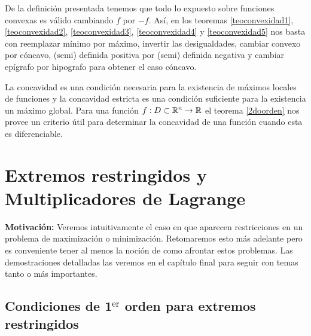 De la definici\'on presentada tenemos que todo lo expuesto sobre funciones convexas es v\'alido cambiando $f$ por $-f$. As\'i, en los teoremas \ref{teoconvexidad1}, \ref{teoconvexidad2}, \ref{teoconvexidad3}, \ref{teoconvexidad4} y \ref{teoconvexidad5} nos basta con reemplazar m\'inimo por m\'aximo, invertir las desigualdades, cambiar convexo por c\'oncavo, (semi) definida positiva por (semi) definida negativa y cambiar ep\'igrafo por hipografo para obtener el caso c\'oncavo.

La concavidad es una condici\'on necesaria para la existencia de m\'aximos locales de funciones y la concavidad estricta es una condici\'on suficiente para la existencia un m\'aximo global. Para una funci\'on $f: D\subset \mathbb{R}^n \to \mathbb{R}$ el teorema \ref{2doorden} nos provee un criterio \'util para determinar la concavidad de una funci\'on cuando esta es diferenciable.

\section{Extremos restringidos y Multiplicadores de Lagrange}

\textbf{Motivaci\'on:} Veremos intuitivamente el caso en que aparecen restricciones en un problema de maximizaci\'on o minimizaci\'on. Retomaremos esto m\'as adelante pero es conveniente tener al menos la noci\'on de como afrontar estos problemas. Las demostraciones detalladas las veremos en el cap\'itulo final para seguir con temas tanto o m\'as importantes.

\subsection{Condiciones de \texorpdfstring{1$^{\text{er}}$}{1er} orden para extremos restringidos}

